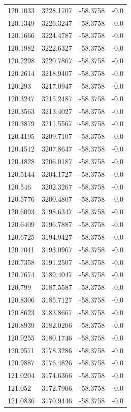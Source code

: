 \begin{table}[H]
\begin{tabular}{llll}
120.1033 & 3228.1707 & -58.3758 & -0.0 \\
120.1349 & 3226.3247 & -58.3758 & -0.0 \\
120.1666 & 3224.4787 & -58.3758 & -0.0 \\
120.1982 & 3222.6327 & -58.3758 & -0.0 \\
120.2298 & 3220.7867 & -58.3758 & -0.0 \\
120.2614 & 3218.9407 & -58.3758 & -0.0 \\
120.293 & 3217.0947 & -58.3758 & -0.0 \\
120.3247 & 3215.2487 & -58.3758 & -0.0 \\
120.3563 & 3213.4027 & -58.3758 & -0.0 \\
120.3879 & 3211.5567 & -58.3758 & -0.0 \\
120.4195 & 3209.7107 & -58.3758 & -0.0 \\
120.4512 & 3207.8647 & -58.3758 & -0.0 \\
120.4828 & 3206.0187 & -58.3758 & -0.0 \\
120.5144 & 3204.1727 & -58.3758 & -0.0 \\
120.546 & 3202.3267 & -58.3758 & -0.0 \\
120.5776 & 3200.4807 & -58.3758 & -0.0 \\
120.6093 & 3198.6347 & -58.3758 & -0.0 \\
120.6409 & 3196.7887 & -58.3758 & -0.0 \\
120.6725 & 3194.9427 & -58.3758 & -0.0 \\
120.7041 & 3193.0967 & -58.3758 & -0.0 \\
120.7358 & 3191.2507 & -58.3758 & -0.0 \\
120.7674 & 3189.4047 & -58.3758 & -0.0 \\
120.799 & 3187.5587 & -58.3758 & -0.0 \\
120.8306 & 3185.7127 & -58.3758 & -0.0 \\
120.8623 & 3183.8667 & -58.3758 & -0.0 \\
120.8939 & 3182.0206 & -58.3758 & -0.0 \\
120.9255 & 3180.1746 & -58.3758 & -0.0 \\
120.9571 & 3178.3286 & -58.3758 & -0.0 \\
120.9887 & 3176.4826 & -58.3758 & -0.0 \\
121.0204 & 3174.6366 & -58.3758 & -0.0 \\
121.052 & 3172.7906 & -58.3758 & -0.0 \\
121.0836 & 3170.9446 & -58.3758 & -0.0 \\

\end{tabular}
\end{table}
